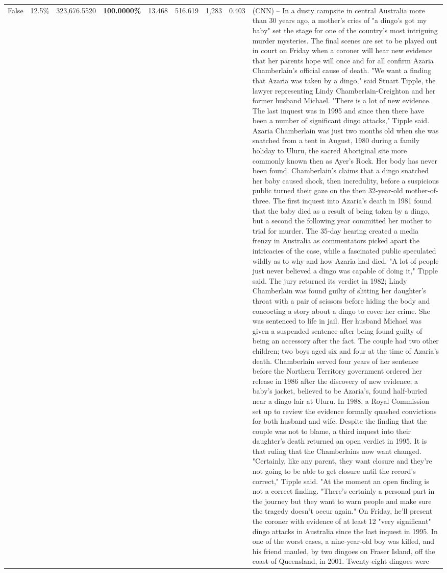 \begin{table}[H]
\begin{tabular}{lllrlllll}
False & 12.5\% & 323,676.5520 & \bfseries \color{red} 100.0000\% & 13.468 & 516.619 & 1,283 & 0.403 & (CNN) -- In a dusty campsite in central Australia more than 30 years ago, a mother's cries of "a dingo's got my baby" set the stage for one of the country's most intriguing murder mysteries. The final scenes are set to be played out in court on Friday when a coroner will hear new evidence that her parents hope will once and for all confirm Azaria Chamberlain's official cause of death. "We want a finding that Azaria was taken by a dingo," said Stuart Tipple, the lawyer representing Lindy Chamberlain-Creighton and her former husband Michael. "There is a lot of new evidence. The last inquest was in 1995 and since then there have been a number of significant dingo attacks," Tipple said. Azaria Chamberlain was just two months old when she was snatched from a tent in August, 1980 during a family holiday to Uluru, the sacred Aboriginal site more commonly known then as Ayer's Rock. Her body has never been found. Chamberlain's claims that a dingo snatched her baby caused shock, then incredulity, before a suspicious public turned their gaze on the then 32-year-old mother-of-three. The first inquest into Azaria's death in 1981 found that the baby died as a result of being taken by a dingo, but a second the following year committed her mother to trial for murder. The 35-day hearing created a media frenzy in Australia as commentators picked apart the intricacies of the case, while a fascinated public speculated wildly as to why and how Azaria had died. "A lot of people just never believed a dingo was capable of doing it," Tipple said. The jury returned its verdict in 1982; Lindy Chamberlain was found guilty of slitting her daughter's throat with a pair of scissors before hiding the body and concocting a story about a dingo to cover her crime. She was sentenced to life in jail. Her husband Michael was given a suspended sentence after being found guilty of being an accessory after the fact. The couple had two other children; two boys aged six and four at the time of Azaria's death. Chamberlain served four years of her sentence before the Northern Territory government ordered her release in 1986 after the discovery of new evidence; a baby's jacket, believed to be Azaria's, found half-buried near a dingo lair at Uluru. In 1988, a Royal Commission set up to review the evidence formally quashed convictions for both husband and wife. Despite the finding that the couple was not to blame, a third inquest into their daughter's death returned an open verdict in 1995. It is that ruling that the Chamberlains now want changed. "Certainly, like any parent, they want closure and they're not going to be able to get closure until the record's correct," Tipple said. "At the moment an open finding is not a correct finding. "There's certainly a personal part in the journey but they want to warn people and make sure the tragedy doesn't occur again." On Friday, he'll present the coroner with evidence of at least 12 "very significant" dingo attacks in Australia since the last inquest in 1995. In one of the worst cases, a nine-year-old boy was killed, and his friend mauled, by two dingoes on Fraser Island, off the coast of Queensland, in 2001. Twenty-eight dingoes were 
\end{tabular}
\end{table}
